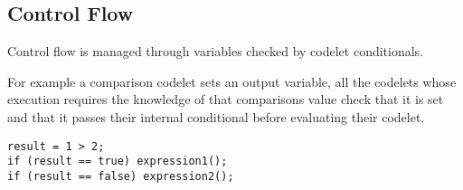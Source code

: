 

\subsection{Control Flow}
Control flow is managed through variables checked by codelet conditionals. 

For example a comparison codelet sets an output variable, 
all the codelets whose execution requires the knowledge of that comparisons
value check that it is set and that it passes their internal conditional before
evaluating their codelet.\ 

\begin{lstlisting}
result = 1 > 2;
if (result == true) expression1();
if (result == false) expression2();
\end{lstlisting}



